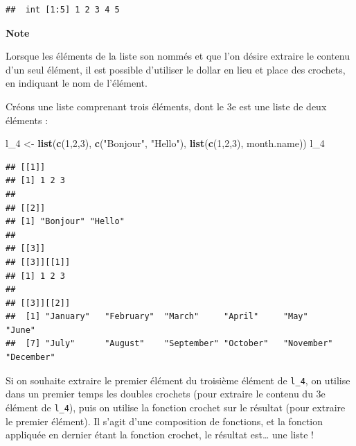 \documentclass[
  11pt,
]{book}
\newenvironment{Shaded}{\begin{snugshade}}{\end{snugshade}}
\newcommand{\DecValTok}[1]{\textcolor[rgb]{0.00,0.00,0.81}{#1}}
\newcommand{\FunctionTok}[1]{\textcolor[rgb]{0.13,0.29,0.53}{\textbf{#1}}}
\newcommand{\NormalTok}[1]{#1}
\newcommand{\OtherTok}[1]{\textcolor[rgb]{0.56,0.35,0.01}{#1}}
\newcommand{\SpecialCharTok}[1]{\textcolor[rgb]{0.81,0.36,0.00}{\textbf{#1}}}
\newcommand{\StringTok}[1]{\textcolor[rgb]{0.31,0.60,0.02}{#1}}
\numberwithin{equation}{section}
\numberwithin{countremarque}{section}
\newenvironment{notebox}{
  \begin{tcolorbox}[breakable, colback=jaune,coltext=black,
                  colframe=grisfonce]}
 {\end{tcolorbox}}
\begin{document}
\begin{lstlisting}
##  int [1:5] 1 2 3 4 5
\end{lstlisting}

\begin{notebox}

\textbf{Note}

Lorsque les éléments de la liste son nommés et que l'on désire extraire le contenu d'un seul élément, il est possible d'utiliser le dollar en lieu et place des crochets, en indiquant le nom de l'élément.

\begin{Shaded}
\end{Shaded}

\end{notebox}

Créons une liste comprenant trois éléments, dont le 3e est une liste de deux éléments :

\begin{Shaded}
\begin{Highlighting}[]
\NormalTok{l\_4 }\OtherTok{\textless{}{-}} 
  \FunctionTok{list}\NormalTok{(}\FunctionTok{c}\NormalTok{(}\DecValTok{1}\NormalTok{,}\DecValTok{2}\NormalTok{,}\DecValTok{3}\NormalTok{),}
     \FunctionTok{c}\NormalTok{(}\StringTok{"Bonjour"}\NormalTok{, }\StringTok{"Hello"}\NormalTok{),}
     \FunctionTok{list}\NormalTok{(}\FunctionTok{c}\NormalTok{(}\DecValTok{1}\NormalTok{,}\DecValTok{2}\NormalTok{,}\DecValTok{3}\NormalTok{), month.name))}
\NormalTok{l\_4}
\end{Highlighting}
\end{Shaded}

\begin{lstlisting}
## [[1]]
## [1] 1 2 3
## 
## [[2]]
## [1] "Bonjour" "Hello"  
## 
## [[3]]
## [[3]][[1]]
## [1] 1 2 3
## 
## [[3]][[2]]
##  [1] "January"   "February"  "March"     "April"     "May"       "June"     
##  [7] "July"      "August"    "September" "October"   "November"  "December"
\end{lstlisting}

Si on souhaite extraire le premier élément du troisième élément de \texttt{l\_4}, on utilise dans un premier temps les doubles crochets (pour extraire le contenu du 3e élément de \texttt{l\_4}), puis on utilise la fonction crochet sur le résultat (pour extraire le premier élément). Il s'agit d'une composition de fonctions, et la fonction appliquée en dernier étant la fonction crochet, le résultat est\ldots{} une liste !
\end{document}
